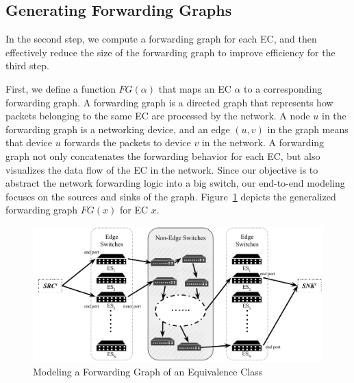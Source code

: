 \subsection{Generating Forwarding Graphs}
\label{Sec:Generating Forwarding Graphs}

In the second step, we compute a forwarding graph for each EC, and then effectively reduce the size of the forwarding graph to improve efficiency for the third step.

First, we define a function $FG(\alpha)$ that maps an EC $\alpha$ to a corresponding forwarding graph. A forwarding graph is a directed graph that represents how packets belonging to the same EC are processed by the network. A node $u$ in the forwarding graph is a networking device, and an edge $(u, v)$ in the graph means that device $u$ forwards the packets to device $v$ in the network.
A forwarding graph not only concatenates the forwarding behavior for each EC, but also visualizes the data flow of the EC in the network.
Since our objective is to abstract the network forwarding logic into a big switch, our end-to-end modeling focuses on the sources and sinks of the graph.
Figure~\ref{Fig:ForwardingGraphECX} depicts the generalized forwarding graph $FG(x)$ for EC $x$.


\begin{figure}[t]
\centering
\includegraphics[scale=.75]{figures/ForwardingGraph.pdf}
\caption{Modeling a Forwarding Graph of an Equivalence Class}
\label{Fig:ForwardingGraphECX}
\end{figure}

